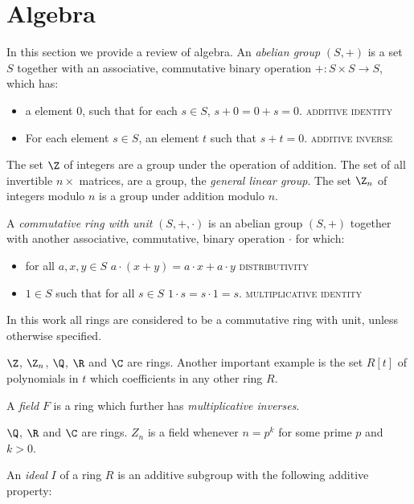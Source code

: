 
\section{Algebra}
In this section we provide a review of algebra. An \emph{abelian group} $(S,+)$ is a set $S$ together with an associative, commutative binary operation $+: S \times S \rightarrow S$, which has:
\begin{itemize}
\item a element $0$, such that for each $s \in S$, $s+0 = 0+s = 0$. \textsc{additive identity}
\item For each element $s \in S$, an element $t$ such that $s+t = 0$.   \textsc{additive inverse}
\end{itemize}
\begin{example}
The set $\Z$ of integers are a group under the operation of addition. The set of all invertible $n \times $ matrices, are a group, the \emph{general linear group}.
The set $\Z_n$ of integers modulo $n$ is a group under addition modulo $n$.
\end{example}
A \emph{commutative ring with unit} $(S,+,\cdot)$ is an abelian group $(S,+)$  together with another associative, commutative, binary operation $\cdot$ for which:
\begin{itemize}
\item for all $a,x,y \in S$ $a \cdot (x + y)  = a \cdot x + a \cdot y$ \textsc{distributivity}
\item $1 \in S$ such that for all $s \in S$ $1 \cdot s = s \cdot 1 = s$.  \textsc{multiplicative identity}
\end{itemize}
In this work all rings are considered to be a commutative ring with unit, unless otherwise specified.  
\begin{example}
$\Z$, $\Z_n$, $\Q$, $\R$ and $\C$ are rings. Another important example is the set $R[t]$ of polynomials in $t$ which coefficients in any other ring $R$.
\end{example}
A \emph{field} $F$ is a ring which further has \emph{multiplicative inverses}.
\begin{example}
$\Q$, $\R$ and $\C$ are rings.  $Z_n$ is a field whenever $n = p^k$ for some prime $p$ and $k > 0$.
\end{example}
An \emph{ideal} $I$ of a ring $R$ is an additive subgroup with the following additive property:
